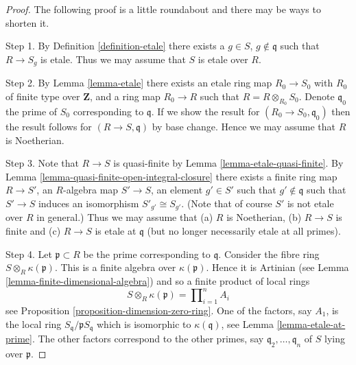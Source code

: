 \begin{proof}
The following proof is a little roundabout and there may be ways to
shorten it.

\medskip\noindent
Step 1. By Definition \ref{definition-etale}
there exists a $g \in S$, $g \not \in \mathfrak q$
such that $R \to S_g$ is etale. Thus we may assume that $S$ is etale
over $R$.

\medskip\noindent
Step 2. By Lemma \ref{lemma-etale} there exists an etale ring map $R_0 \to S_0$
with $R_0$ of finite type over $\mathbf{Z}$, and a ring map
$R_0 \to R$ such that $R = R \otimes_{R_0} S_0$. Denote
$\mathfrak q_0$ the prime of $S_0$ corresponding to $\mathfrak q$.
If we show the result for $(R_0 \to S_0, \mathfrak q_0)$ then the
result follows for $(R \to S, \mathfrak q)$ by base change. Hence
we may assume that $R$ is Noetherian.

\medskip\noindent
Step 3.
Note that $R \to S$ is quasi-finite by Lemma \ref{lemma-etale-quasi-finite}.
By Lemma \ref{lemma-quasi-finite-open-integral-closure}
there exists a finite ring map $R \to S'$, an $R$-algebra map
$S' \to S$, an element $g' \in S'$ such that
$g' \not \in \mathfrak q$ such that $S' \to S$ induces
an isomorphism $S'_{g'} \cong S_{g'}$.
(Note that of course $S'$ is not etale over $R$ in general.)
Thus we may assume that (a) $R$ is Noetherian, (b) $R \to S$ is finite
and (c) $R \to S$ is etale at $\mathfrak q$
(but no longer necessarily etale at all primes).

\medskip\noindent
Step 4. Let $\mathfrak p \subset R$ be the prime corresponding
to $\mathfrak q$. Consider the fibre ring
$S \otimes_R \kappa(\mathfrak p)$. This is a finite algebra over
$\kappa(\mathfrak p)$. Hence it is Artinian
(see Lemma \ref{lemma-finite-dimensional-algebra}) and
so a finite product of local rings
$$
S \otimes_R \kappa(\mathfrak p) = \prod\nolimits_{i = 1}^n A_i
$$
see Proposition \ref{proposition-dimension-zero-ring}. One of the factors,
say $A_1$, is the local ring $S_{\mathfrak q}/\mathfrak pS_{\mathfrak q}$
which is isomorphic to $\kappa(\mathfrak q)$,
see Lemma \ref{lemma-etale-at-prime}. The other factors correspond to
the other primes, say $\mathfrak q_2, \ldots, \mathfrak q_n$ of
$S$ lying over $\mathfrak p$.


\end{proof}
